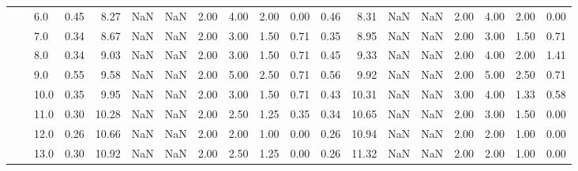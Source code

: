\begin{tabular}{lllrrrrrrrrrrrrrrrr}
       &     & 6.0  &      0.45 &       8.27 &               NaN &                NaN & 2.00 &   4.00 &             2.00 &                         0.00 &      0.46 &       8.31 &               NaN &                NaN & 2.00 &   4.00 &             2.00 &                         0.00 \\
       &     & 7.0  &      0.34 &       8.67 &               NaN &                NaN & 2.00 &   3.00 &             1.50 &                         0.71 &      0.35 &       8.95 &               NaN &                NaN & 2.00 &   3.00 &             1.50 &                         0.71 \\
       &     & 8.0  &      0.34 &       9.03 &               NaN &                NaN & 2.00 &   3.00 &             1.50 &                         0.71 &      0.45 &       9.33 &               NaN &                NaN & 2.00 &   4.00 &             2.00 &                         1.41 \\
       &     & 9.0  &      0.55 &       9.58 &               NaN &                NaN & 2.00 &   5.00 &             2.50 &                         0.71 &      0.56 &       9.92 &               NaN &                NaN & 2.00 &   5.00 &             2.50 &                         0.71 \\
       &     & 10.0 &      0.35 &       9.95 &               NaN &                NaN & 2.00 &   3.00 &             1.50 &                         0.71 &      0.43 &      10.31 &               NaN &                NaN & 3.00 &   4.00 &             1.33 &                         0.58 \\
       &     & 11.0 &      0.30 &      10.28 &               NaN &                NaN & 2.00 &   2.50 &             1.25 &                         0.35 &      0.34 &      10.65 &               NaN &                NaN & 2.00 &   3.00 &             1.50 &                         0.00 \\
       &     & 12.0 &      0.26 &      10.66 &               NaN &                NaN & 2.00 &   2.00 &             1.00 &                         0.00 &      0.26 &      10.94 &               NaN &                NaN & 2.00 &   2.00 &             1.00 &                         0.00 \\
       &     & 13.0 &      0.30 &      10.92 &               NaN &                NaN & 2.00 &   2.50 &             1.25 &                         0.00 &      0.26 &      11.32 &               NaN &                NaN & 2.00 &   2.00 &             1.00 &                         0.00 \\

\end{tabular}
